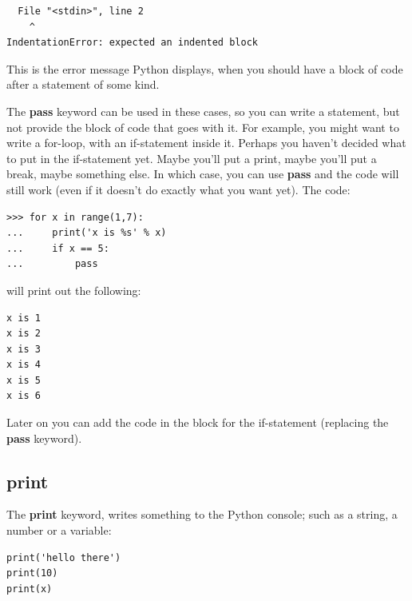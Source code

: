 \begin{listingignore}
\begin{verbatim}
  File "<stdin>", line 2
    ^
IndentationError: expected an indented block
\end{verbatim}
\end{listingignore}

This is the error message Python displays, when you should have a block of code after a statement of some kind.
\par
The \textbf{pass} keyword can be used in these cases, so you can write a statement, but not provide the block of code that goes with it.  For example, you might want to write a for-loop, with an if-statement inside it.  Perhaps you haven't decided what to put in the if-statement yet.  Maybe you'll put a print, maybe you'll put a break, maybe something else.  In which case, you can use \textbf{pass} and the code will still work (even if it doesn't do exactly what you want yet).  The code:

\begin{listing}
\begin{verbatim}
>>> for x in range(1,7):
...     print('x is %s' % x)
...     if x == 5:
...         pass
\end{verbatim}
\end{listing}

\noindent
will print out the following:

\begin{listing}
\begin{verbatim}
x is 1
x is 2
x is 3
x is 4
x is 5
x is 6
\end{verbatim}
\end{listing}

\noindent
Later on you can add the code in the block for the if-statement (replacing the \textbf{pass} keyword).

\subsection*{print}

The \textbf{print} keyword, writes something to the Python console; such as a string, a number or a variable:

\begin{listing}
\begin{verbatim}
print('hello there')
print(10)
print(x)
\end{verbatim}
\end{listing}

